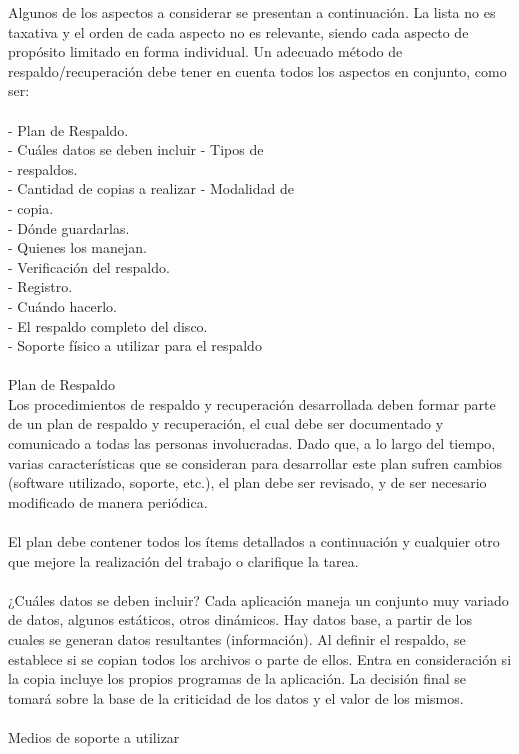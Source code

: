 \begin{enumerate}[3.1.]
Algunos de los aspectos a considerar se presentan a continuación. La lista no es taxativa y el orden de cada aspecto no es relevante, siendo cada aspecto de propósito limitado en forma individual. Un adecuado método de respaldo/recuperación debe tener en cuenta todos los aspectos en conjunto, como ser:  
\\
\\-	 Plan de Respaldo.
\\-	Cuáles datos se deben incluir - Tipos de 
\\-	respaldos.
\\-	Cantidad de copias a realizar - Modalidad de 
\\-	copia.
\\-	Dónde guardarlas.
\\-	Quienes los manejan.
\\-	Verificación del respaldo.
\\-	Registro.
\\-	Cuándo hacerlo.
\\-	El respaldo completo del disco.
\\-	Soporte físico a utilizar para el respaldo 
\\
\\Plan de Respaldo  
\\Los procedimientos de respaldo y recuperación desarrollada deben formar parte de un plan de respaldo y recuperación, el cual debe ser documentado y comunicado a todas las personas involucradas. Dado que, a lo largo del tiempo, varias características que se consideran para desarrollar este plan sufren cambios (software utilizado, soporte,
etc.), el plan debe ser revisado, y de ser necesario modificado de manera periódica. 
\\ 
\\El plan debe contener todos los ítems detallados a continuación y cualquier otro que mejore la realización del trabajo o clarifique la tarea.
\\ 
\\¿Cuáles datos se deben incluir? 
Cada aplicación maneja un conjunto muy variado de datos, algunos estáticos, otros dinámicos. Hay datos base, a partir de los cuales se generan datos resultantes (información). Al definir el respaldo, se establece si se copian todos los archivos o parte de ellos. Entra en consideración si la copia incluye los propios programas de la aplicación. La decisión final se tomará sobre la base de la criticidad de los datos y el valor de los mismos.  
\\
\\Medios de soporte a utilizar 

\end{enumerate}
